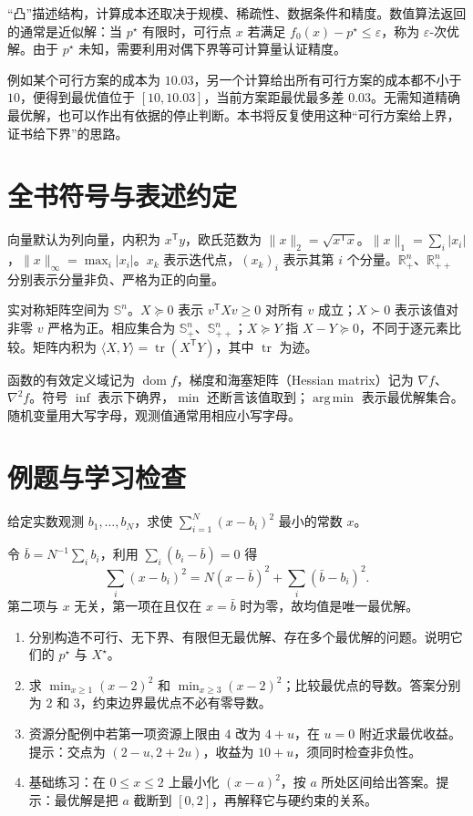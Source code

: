 \documentclass[UTF8,12pt,a4paper,fontset=fandol]{ctexbook}
\begin{document}
“凸”描述结构，计算成本还取决于规模、稀疏性、数据条件和精度。数值算法返回的通常是近似解：当 $p^\star$ 有限时，可行点 $x$ 若满足 $f_0(x)-p^\star\leq\varepsilon$，称为 $\varepsilon$-次优解。由于 $p^\star$ 未知，需要利用对偶下界等可计算量认证精度。

例如某个可行方案的成本为 $10.03$，另一个计算给出所有可行方案的成本都不小于 $10$，便得到最优值位于 $[10,10.03]$，当前方案距最优最多差 $0.03$。无需知道精确最优解，也可以作出有依据的停止判断。本书将反复使用这种“可行方案给上界，证书给下界”的思路。

\section{全书符号与表述约定}

向量默认为列向量，内积为 $x^{\mathsf T}y$，欧氏范数为 $\|x\|_2=\sqrt{x^{\mathsf T}x}$。$\|x\|_1=\sum_i|x_i|$，$\|x\|_\infty=\max_i|x_i|$。$x_k$ 表示迭代点，$(x_k)_i$ 表示其第 $i$ 个分量。$\mathbb R_+^n$、$\mathbb R_{++}^n$ 分别表示分量非负、严格为正的向量。

实对称矩阵空间为 $\mathbb S^n$。$X\succeq0$ 表示 $v^{\mathsf T}Xv\geq0$ 对所有 $v$ 成立；$X\succ0$ 表示该值对非零 $v$ 严格为正。相应集合为 $\mathbb S_+^n$、$\mathbb S_{++}^n$；$X\succeq Y$ 指 $X-Y\succeq0$，不同于逐元素比较。矩阵内积为 $\langle X,Y\rangle=\operatorname{tr}(X^{\mathsf T}Y)$，其中 $\operatorname{tr}$ 为迹。

函数的有效定义域记为 $\operatorname{dom}f$，梯度和海塞矩阵（Hessian matrix）记为 $\nabla f$、$\nabla^2f$。符号 $\inf$ 表示下确界，$\min$ 还断言该值取到；$\operatorname{arg\,min}$ 表示最优解集合。随机变量用大写字母，观测值通常用相应小写字母。

\section{例题与学习检查}
\begin{example}[均值作为最小二乘解]
给定实数观测 $b_1,\ldots,b_N$，求使 $\sum_{i=1}^N(x-b_i)^2$ 最小的常数 $x$。
\end{example}
\begin{solve}
令 $\bar b=N^{-1}\sum_i b_i$，利用 $\sum_i(b_i-\bar b)=0$ 得
\[
 \sum_i(x-b_i)^2=N(x-\bar b)^2+\sum_i(\bar b-b_i)^2.
\]
第二项与 $x$ 无关，第一项在且仅在 $x=\bar b$ 时为零，故均值是唯一最优解。
\end{solve}
\begin{enumerate}
 \item 分别构造不可行、无下界、有限但无最优解、存在多个最优解的问题。说明它们的 $p^\star$ 与 $X^\star$。
 \item 求 $\min_{x\geq1}(x-2)^2$ 和 $\min_{x\geq3}(x-2)^2$；比较最优点的导数。答案分别为 $2$ 和 $3$，约束边界最优点不必有零导数。
 \item 资源分配例中若第一项资源上限由 $4$ 改为 $4+u$，在 $u=0$ 附近求最优收益。提示：交点为 $(2-u,2+2u)$，收益为 $10+u$，须同时检查非负性。
 \item 基础练习：在 $0\leq x\leq2$ 上最小化 $(x-a)^2$，按 $a$ 所处区间给出答案。提示：最优解是把 $a$ 截断到 $[0,2]$，再解释它与硬约束的关系。
\end{enumerate}
\end{document}

